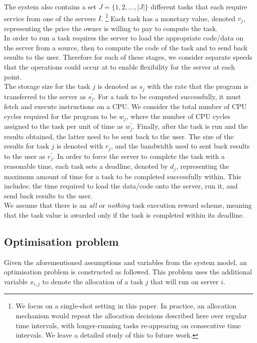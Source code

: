 The system also contains a set $J = \{1,2,\ldots,\left| J \right|\}$ different tasks that each require service from one
of the servers $I$.
\footnote{We focus on a single-shot setting in this paper. In practice, an allocation mechanism would repeat the
allocation decisions described here over regular time intervals, with longer-running tasks re-appearing on consecutive
time intervals. We leave a detailed study of this to future work.} Each task has a monetary value, denoted $v_j$,
representing the price the owner is willing to pay to compute the task. \\
In order to run a task requires the server to load the appropriate code/data on the server from a source, then to
compute the code of the task and to send back results to the user. Therefore for each of these stages, we consider
separate speeds that the operations could occur at to enable flexibility for the server at each point. \\
The storage size for the task $j$ is denoted as $s_j$ with the rate that the program is transferred to the server
as $s^{'}_j$. For a task to be computed successfully, it must fetch and execute instructions on a CPU. We consider the
total number of CPU cycles required for the program to be $w_j$, where the number of CPU cycles assigned to the task
per unit of time as $w^{'}_j$. Finally, after the task is run and the results obtained, the latter need to be sent back
to the user. The size of the results for task $j$ is denoted with $r_j$, and the bandwidth used to sent back results to
the user as $r^{'}_j$.
In order to force the server to complete the task with a reasonable time, each task sets a deadline, denoted by $d_j$,
representing the maximum amount of time for a task to be completed successfully within. This includes: the time
required to load the data/code onto the server, run it, and send back results to the user. \\
We assume that there is an \emph{all} or \emph{nothing} task execution reward scheme, meaning that the task value is
awarded only if the task is completed within its deadline.

\subsection{Optimisation problem}\label{subsec:optimisation-problem}
Given the aforementioned assumptions and variables from the system model, an optimisation problem is constructed as
followed. This problem uses the additional variable $x_{i,j}$ to denote the allocation of a task $j$ that will run on
server $i$.

